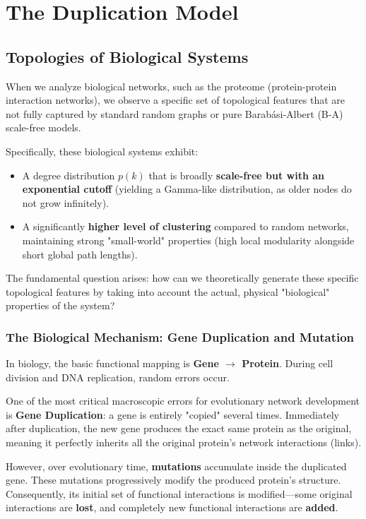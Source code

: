 \section{The Duplication Model}

\subsection{Topologies of Biological Systems}
When we analyze biological networks, such as the proteome (protein-protein interaction networks), we observe a specific set of topological features that are not fully captured by standard random graphs or pure Barabási-Albert (B-A) scale-free models.

Specifically, these biological systems exhibit:
\begin{itemize}
    \item A degree distribution \( p(k) \) that is broadly \textbf{scale-free but with an exponential cutoff} (yielding a Gamma-like distribution, as older nodes do not grow infinitely).
    \item A significantly \textbf{higher level of clustering} compared to random networks, maintaining strong "small-world" properties (high local modularity alongside short global path lengths).
\end{itemize}
The fundamental question arises: how can we theoretically generate these specific topological features by taking into account the actual, physical "biological" properties of the system?

\subsubsection{The Biological Mechanism: Gene Duplication and Mutation}
In biology, the basic functional mapping is \textbf{Gene \( \rightarrow \) Protein}. During cell division and DNA replication, random errors occur.

One of the most critical macroscopic errors for evolutionary network development is \textbf{Gene Duplication}: a gene is entirely "copied" several times. Immediately after duplication, the new gene produces the exact same protein as the original, meaning it perfectly inherits all the original protein's network interactions (links).

However, over evolutionary time, \textbf{mutations} accumulate inside the duplicated gene. These mutations progressively modify the produced protein's structure. Consequently, its initial set of functional interactions is modified—some original interactions are \textbf{lost}, and completely new functional interactions are \textbf{added}.


